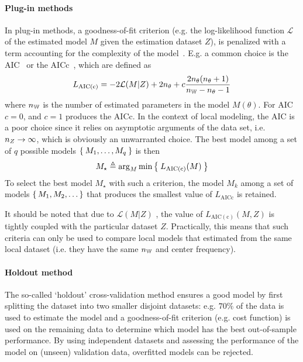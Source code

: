 \paragraph{Plug-in methods}
In plug-in methods, a goodness-of-fit criterion (e.g. the log-likelihood function $\mathcal{L}$ of the estimated model $M$ given the estimation dataset $Z$), is penalized with a term accounting for the complexity of the model~\citep{Burnham2002}.
E.g. a common choice is the \gls{AIC}~\citep{Akaike1974} or the \gls{AICc}~\citep{Hurvich1989}, which are defined as
\begin{equation}
  L_{\mathrm{AIC(c)}} = - 2  \mathcal{L}(M | Z) + 2 n_{\theta} + c \frac{2 n_{\theta} (n_{\theta} + 1)}{n_{\mathbb{W}} - n_{\theta} - 1}
\end{equation}
where $n_{\mathbb{W}}$ is the number of  estimated parameters in the model $M(\theta)$.
For \gls{AIC} $c=0$, and $c=1$ produces the \gls{AICc}.
In the context of local modeling, the \gls{AIC} is a poor choice since it relies on asymptotic arguments of the data set, i.e. $n_{Z} \to \infty$, which is obviously an unwarranted choice.
The best model among a set of $q$ possible models $\Set{M_1, \ldots, M_q}$ is then
\begin{equation}
  M_{\star} \triangleq 
  \arg_{M} \min 
  \Set{
    L_{\mathrm{AIC(c)}}(M)
  }
\end{equation}
To select the best model $M_{\star}$ with such a criterion, the model $M_k$ among a set of models $\set{M_1, M_2, \ldots}$ that produces the smallest value of $L_{\mathrm{AICc}}$ is retained.

\begin{remark}
It should be noted that due to $\mathcal{L}(M | Z)$ , the value of $L_{\mathrm{AIC(c)}}(M,Z)$ is tightly coupled with the particular dataset $Z$.
Practically, this means that such criteria can only be used to compare local models that estimated from the same local dataset (i.e. they have the same $n_{\mathbb{W}}$ and center frequency).
\end{remark}

\paragraph{Holdout method}
The so-called `holdout' cross-validation method ensures a good model by first splitting the dataset into two smaller disjoint datasets: e.g. $70\%$ of the data  is used to estimate the model and a goodness-of-fit criterion (e.g. cost function) is used on the remaining data to determine which model has the best out-of-sample performance.
By using independent datasets and assessing the performance of the model on (unseen) validation data, overfitted models can be rejected.

